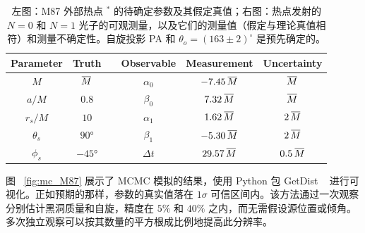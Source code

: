 \documentclass[aps,reprint,superscriptaddress,nofootinbib,floatfix,longbibliography,preprintnumbers]{revtex4-1}
\newcommand{\overbar}[1]{\mkern 1mu\overline{\mkern-1mu#1\mkern-1mu}\mkern 1mu}
\begin{document}
   \begin{table}[!htbp]
\renewcommand\arraystretch{1.3} 
\setlength\tabcolsep{2.5pt} 
\begin{tabular}{cc|cccc}
\hline\hline
Parameter & Truth & & Observable & Measurement & Uncertainty  \\  \hline
         $M$         &         $\overbar{M}$          & &         $\alpha_0$         &         $-7.45\,\overbar{M}$         &         $\overbar{M}$          \\  
         $a/M$         &         $0.8$         & &         $\beta_0$         &         $7.32\,\overbar{M}$         &         $\overbar{M}$          \\  
         $r_s/M$         &         $10$          & &         $\alpha_1$         &         $1.62\,\overbar{M}$         &         $2\,\overbar{M}$         \\  
         $\theta_s$         &         $\ang{90}$          & &         $\beta_1$         &         $-5.30\,\overbar{M}$         &         $2\,\overbar{M}$         \\ 
         $\phi_s$         &         $\ang{-45}$          & &         $\Delta t$         &         $29.57\,\overbar{M}$         &         $0.5\,\overbar{M}$         \\  \hline
\end{tabular}
\caption{左图：M87 外部热点    $^*$    的待确定参数及其假定真值；右图：热点发射的    $N=0$    和    $N=1$    光子的可观测量，以及它们的测量值（假定与理论真值相符）和测量不确定性。自旋投影 PA 和    $\theta_o = {(163\pm 2)}^\circ$    是预先确定的。  }
\label{tab:set M87}
\end{table}     

图~   \ref{fig:mc_M87}    展示了 MCMC 模拟的结果，使用 Python 包 GetDist ~   \cite{Lewis:2019xzd}    进行可视化。正如预期的那样，参数的真实值落在    $1\sigma$    可信区间内。该方法通过一次观察分别估计黑洞质量和自旋，精度在    $5 \% $    和    $40 \% $    之内，而无需假设源位置或倾角。多次独立观察可以按其数量的平方根成比例地提高此分辨率。  
\end{document}
